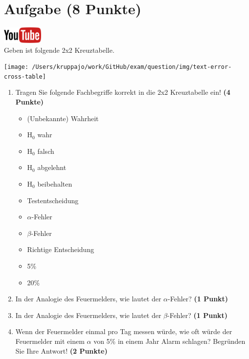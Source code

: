 \documentclass[a4paper, 10pt]{scrartcl}\usepackage[]{graphicx}\usepackage[]{xcolor}
\begin{document}
\section{Aufgabe \hfill (8 Punkte)}

\hfill\href{https://youtu.be/3DfWs9NNrCk}{\includegraphics[width =
  2cm]{img/youtube}}\\[1Ex]




Geben ist folgende 2x2 Kreuztabelle. 

\begin{center}
  \texttt{[image: /Users/kruppajo/work/GitHub/exam/question/img/text-error-cross-table]}
\end{center}

\begin{enumerate}
\item Tragen Sie folgende Fachbegriffe korrekt in die 2x2 Kreuztabelle ein! \textbf{(4 Punkte)}
  \begin{itemize}
  \item (Unbekannte) Wahrheit	
  \item H$_0$ wahr
  \item H$_0$ falsch
  \item H$_0$ abgelehnt
  \item H$_0$ beibehalten
  \item Testentscheidung
  \item $\alpha$-Fehler
  \item $\beta$-Fehler
  \item Richtige Entscheidung
  \item 5\%
  \item 20\%
  \end{itemize}
\item In der Analogie des Feuermelders, wie lautet der $\alpha$-Fehler? \textbf{(1 Punkt)}
\item In der Analogie des Feuermelders, wie lautet der $\beta$-Fehler? \textbf{(1 Punkt)}
\item Wenn der Feuermelder einmal pro Tag messen w{\"u}rde, wie oft w{\"u}rde der
  Feuermelder mit einem $\alpha$ von 5\% in einem Jahr Alarm schlagen?
  Begr{\"u}nden Sie Ihre Antwort! \textbf{(2 Punkte)}
\end{enumerate}
\end{document}
